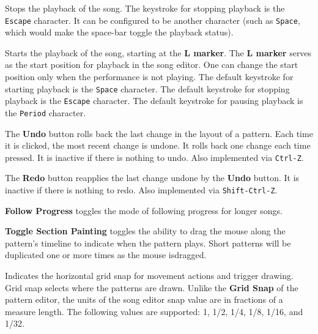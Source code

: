    Stops the playback of the song.
   The keystroke for stopping playback is the \texttt{Escape} character.
   It can be configured to be another character (such as \texttt{Space}, which
   would make the space-bar toggle the playback status).

   Starts the playback of the song, starting at the \textbf{L marker}.
   The \textbf{L marker} serves as the start position for playback
   in the song editor.  One can change the start position only when the
   performance is not playing.
   The default keystroke for starting playback is the \texttt{Space} character.
   The default keystroke for stopping playback is the \texttt{Escape} character.
   The default keystroke for pausing playback is the \texttt{Period} character.

   The \textbf{Undo} button rolls back the last change in the layout of a
   pattern.  Each time it is clicked, the most recent change is undone.
   It rolls back one change each time pressed.
   It is inactive if there is nothing to undo.
   Also implemented via \texttt{Ctrl-Z}.

   The \textbf{Redo} button reapplies the last change undone by
   the \textbf{Undo} button.  It is inactive if there is nothing to redo.
   Also implemented via \texttt{Shift-Ctrl-Z}.

      \textbf{Follow Progress} toggles the mode of following progress
         for longer songs.

      \textbf{Toggle Section Painting} toggles the ability
      to drag the mouse along the pattern's timeline to indicate when the
      pattern plays.  Short patterns will be duplicated one or more times as
      the mouse isdragged.

   Indicates the horizontal grid snap for movement actions and trigger drawing.
   Grid snap selects where the patterns are drawn.
   Unlike the \textbf{Grid Snap} of the pattern editor, the units
   of the song editor snap value are in fractions of a measure length.
   The following values are supported:
   1, 1/2, 1/4, 1/8, 1/16, and 1/32.

